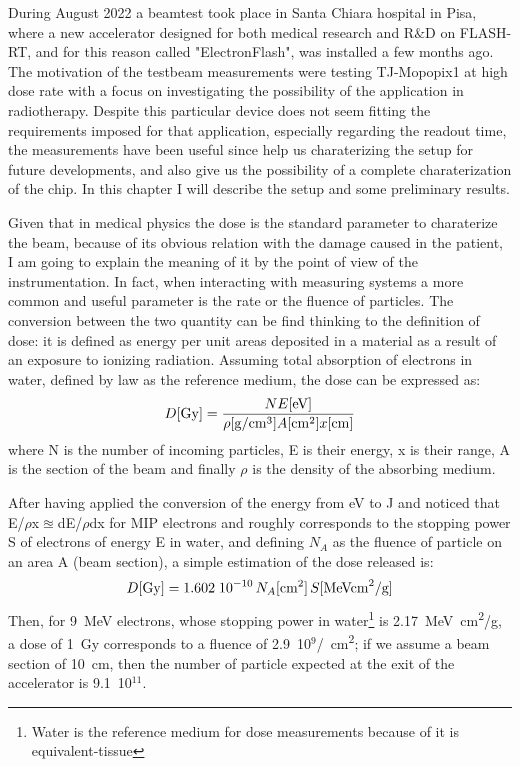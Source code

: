 During August 2022 a beamtest took place in Santa Chiara hospital in Pisa, where a new accelerator designed for both medical research and R$\&$D on FLASH-RT, and for this reason called "ElectronFlash", was installed a few months ago. 
The motivation of the testbeam measurements were testing TJ-Mopopix1 at high dose rate with a focus on investigating the possibility of the application in radiotherapy. Despite this particular device does not seem fitting the requirements imposed for that application, especially regarding the readout time, the measurements have been useful since help us charaterizing the setup for future developments, and also give us the possibility of a complete charaterization of the chip.
In this chapter I will describe the setup and some preliminary results.  


Given that in medical physics the dose is the standard parameter to charaterize the beam, because of its obvious relation with the damage caused in the patient, I am going to explain the meaning of it by the point of view of the instrumentation.
In fact, when interacting with measuring systems a more common and useful parameter is the rate or the fluence of particles.
The conversion between the two quantity can be find thinking to the definition of dose: it is defined as energy per unit areas deposited in a material as a result of an exposure to ionizing radiation. 
Assuming total absorption of electrons in water, defined by law as the reference medium, the dose can be expressed as: 
\begin{equation}
   D[\si{Gy}] = \frac{N E[\si{eV}]}{\rho[\si{g/cm}^3] A[\si{cm\squared}] x[\si{cm}]}
\end{equation} 
where N is the number of incoming particles, E is their energy,  x is their range, A is the section of the beam and finally $\rho$ is the density of the absorbing medium.  

After having applied the conversion of the energy from \si{eV} to \si{J} and noticed that E/$\rho$x$\approxeq$dE/$\rho$dx for MIP electrons and roughly corresponds to the stopping power S of electrons of energy E in water, and defining $N_{A}$ as the fluence of particle on an area A (beam section), a simple estimation of the dose released is:
\begin{equation}
   D[\si{Gy}] = 1.602\;10^{-10}\,N_{A}[\si{cm\squared}]\,S[\si{MeV cm\squared /g}]
\end{equation}\label{eq:DOSE_N_counts}
Then, for \SI{9}{MeV} electrons, whose stopping power in water\footnote{Water is the reference medium for dose measurements because of it is equivalent-tissue} is \SI{2.17}{MeV cm\squared/g}, a dose of \SI{1}{Gy} corresponds to a fluence of 2.9~10$^{9}$\si{/cm\squared}; if we assume a beam section of \SI{10}{cm}, then the number of particle expected at the exit of the accelerator is 9.1~10$^{11}$.


